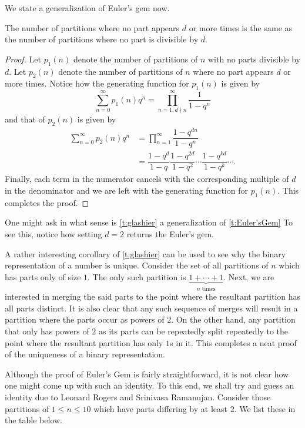 We state a generalization of Euler's gem now. 
\begin{theorem}
The number of partitions where no part appears $d$ or more times is the same as the number of partitions where no part is divisible by $d$.
\label{t:glashier}
\end{theorem}
\begin{proof}
Let $p_1(n)$ denote the number of partitions of $n$ with no parts divisible by $d$. Let $p_2(n)$ denote the number of partitions of $n$ where no part appears $d$ or more times. Notice how the generating function for $p_1(n)$ is given by \[
\sum_{n=0}^{\infty}p_1(n)q^n = \prod_{n=1, d\nmid n}^{\infty}\dfrac{1}{1-q^n}
\]
and that of $p_2(n)$ is given by 
\begin{align*}
\sum_{n=0}^{\infty}p_2(n)q^n &= \prod_{n=1}^{\infty}\dfrac{1-q^{dn}}{1-q^n} \\
&= \dfrac{1-q^d}{1-q}\dfrac{1-q^{2d}}{1-q^2}\cdots\dfrac{1-q^{kd}}{1-q^k}\cdots.
\end{align*}
Finally, each term in the numerator cancels with the corresponding multiple of $d$ in the denominator and we are left with the generating function for $p_1(n)$. This completes the proof.
\end{proof}
\begin{remark}
One might ask in what sense is \cref{t:glashier} a generalization of \cref{t:Euler'sGem} To see this, notice how setting $d=2$ returns the Euler's gem.  
\end{remark}
A rather interesting corollary of \cref{t:glashier} can be used to see why the binary representation of a number is unique. Consider the set of all partitions of $n$ which has parts only of size $1$. The only such partition is $\underbrace{1+\cdots+1}_{n\text{ times}}$. Next, we are interested in merging the said parts to the point where the resultant partition has all parts distinct. It is also clear that any such sequence of merges will result in a partition where the parts occur as powers of $2$. On the other hand, any partition that only has powers of $2$ as its parts can be repeatedly split repeatedly to the point where the resultant partition has only $1$s in it. This completes a neat proof of the uniqueness of a binary representation. 
\par
Although the proof of Euler's Gem is fairly straightforward, it is not clear how one might come up with such an identity. To this end, we shall try and guess an identity due to Leonard Rogers and Srinivasa Ramanujan. Consider those partitions of $1\leq n\leq 10$ which have parts differing by at least $2$. We list these in the table below.
